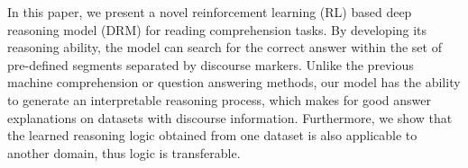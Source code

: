 In this paper, we present a novel reinforcement learning (RL) based deep reasoning model (DRM) for reading comprehension tasks. By developing its reasoning ability, the model can search for the correct answer within the set of pre-defined segments separated by discourse markers. Unlike the previous machine comprehension or question answering methods, our model has the ability to generate an interpretable reasoning process, which makes for good answer explanations on datasets with  discourse information. Furthermore, we show that the learned reasoning logic obtained from one dataset is also applicable to another domain, thus logic is transferable. 
